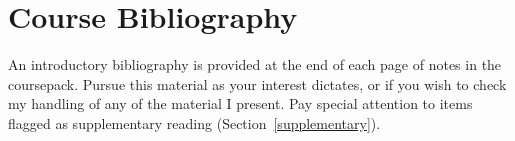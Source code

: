 \documentclass[titlepage]{article}
\begin{document}
\section{Course Bibliography}
\label{bibliography}

An introductory bibliography is provided at the end of each page of
notes in the coursepack. Pursue this material as your interest
dictates, or if you wish to check my handling of any of the material I
present. Pay special attention to items flagged as supplementary reading
(Section~\ref{supplementary}).
\end{document}
